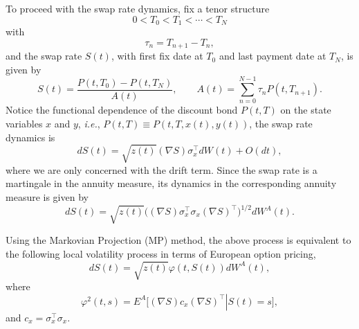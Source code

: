 \documentclass[12pt]{article}
\begin{document}
    To proceed with the swap rate dynamics, fix a tenor structure
    \begin{equation}
      0<T_0<T_1<\cdots<T_N
    \end{equation}
    with
    \begin{equation}
      \tau_n=T_{n+1}-T_n,
    \end{equation}
    and the swap rate $S(t)$, with first fix date at $T_0$ and last payment date at $T_N$, is given by
    \begin{equation}
      S(t)=\frac{P(t,T_0)-P(t,T_N)}{A(t)},\quad\quad A(t)=\sum_{n=0}^{N-1}\tau_nP(t,T_{n+1}).
    \end{equation}
    Notice the functional dependence of the discount bond $P(t,T)$ on the state variables $x$ and $y$,
    {\it i.e.}, $P(t,T)\equiv P(t,T,x(t),y(t))$, the swap rate dynamics is
    \begin{equation}
      dS(t) = \sqrt{z(t)} (\nabla S) \sigma_x^{\top}dW(t) + O(dt),
    \end{equation}
    where we are only concerned with the drift term. Since the swap rate is a martingale in the annuity
    measure, its dynamics in the corresponding annuity measure is given by
    \begin{equation}
      dS(t) = \sqrt{z(t)}\bigg((\nabla S) \sigma_x^{\top}\sigma_x (\nabla S)^{\top} \bigg)^{1/2} dW^A(t).
    \end{equation}

    Using the Markovian Projection (MP) method, the above process is equivalent to the following local volatility
    process in terms of European option pricing,
    \begin{equation}
      dS(t) = \sqrt{z(t)}\varphi(t,S(t)) dW^A(t),
    \end{equation}
    where
    \begin{equation}
      \varphi^2(t,s) = E^A\bigg[\left.(\nabla S) c_x (\nabla S)^{\top}\right|S(t)=s\bigg],
      \label{local}
    \end{equation}
    and $c_x=\sigma_x^{\top}\sigma_x$.
\end{document}

